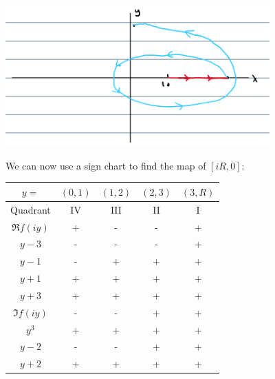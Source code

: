 \documentclass{article}
\begin{document}
\begin{itemize}
            \begin{center}
                  \includegraphics[width=4in]{p9-2.png}
            \end{center}
            We can now use a sign chart to find the map of $[iR,0]$:
            \begin{center}
                  \begin{tabular}{c|c|c|c|c}
                        \hline
                        $y=$        & $(0,1)$ & $(1,2)$ & $(2,3)$ & $(3,R)$ \\
                        \hline\hline
                        Quadrant    & IV      & III     & II      & I       \\
                        \hline\hline
                        $\Re f(iy)$ & +       & -       & -       & +       \\
                        \hline
                        $y-3$       & -       & -       & -       & +       \\
                        \hline
                        $y-1$       & -       & +       & +       & +       \\
                        \hline
                        $y+1$       & +       & +       & +       & +       \\
                        \hline
                        $y+3$       & +       & +       & +       & +       \\
                        \hline\hline
                        $\Im f(iy)$ & -       & -       & +       & +       \\
                        \hline
                        $y^3$       & +       & +       & +       & +       \\
                        \hline
                        $y-2$       & -       & -       & +       & +       \\
                        \hline
                        $y+2$       & +       & +       & +       & +       \\

\end{tabular}
\end{center}
\end{itemize}
\end{document}
